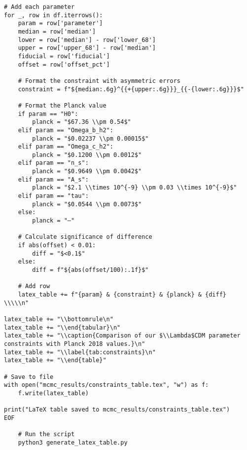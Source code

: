 \documentclass[11pt]{article}
\begin{document}
\begin{enumerate}
\begin{lstlisting}[basicstyle=\small\ttfamily]
# Add each parameter
for _, row in df.iterrows():
    param = row['parameter']
    median = row['median']
    lower = row['median'] - row['lower_68']
    upper = row['upper_68'] - row['median']
    fiducial = row['fiducial']
    offset = row['offset_pct']
    
    # Format the constraint with asymmetric errors
    constraint = f"${median:.6g}^{{+{upper:.6g}}}_{{-{lower:.6g}}}$"
    
    # Format the Planck value
    if param == "H0":
        planck = "$67.36 \\pm 0.54$"
    elif param == "Omega_b_h2":
        planck = "$0.02237 \\pm 0.00015$"
    elif param == "Omega_c_h2":
        planck = "$0.1200 \\pm 0.0012$"
    elif param == "n_s":
        planck = "$0.9649 \\pm 0.0042$"
    elif param == "A_s":
        planck = "$2.1 \\times 10^{-9} \\pm 0.03 \\times 10^{-9}$"
    elif param == "tau":
        planck = "$0.0544 \\pm 0.0073$"
    else:
        planck = "—"
    
    # Calculate significance of difference
    if abs(offset) < 0.01:
        diff = "$<0.1$"
    else:
        diff = f"${abs(offset/100):.1f}$"
    
    # Add row
    latex_table += f"{param} & {constraint} & {planck} & {diff} \\\\\n"

latex_table += "\\bottomrule\n"
latex_table += "\\end{tabular}\n"
latex_table += "\\caption{Comparison of our $\\Lambda$CDM parameter constraints with Planck 2018 values.}\n"
latex_table += "\\label{tab:constraints}\n"
latex_table += "\\end{table}"

# Save to file
with open("mcmc_results/constraints_table.tex", "w") as f:
    f.write(latex_table)

print("LaTeX table saved to mcmc_results/constraints_table.tex")
EOF

    # Run the script
    python3 generate_latex_table.py
    \end{lstlisting}
\end{enumerate}
\end{document}
